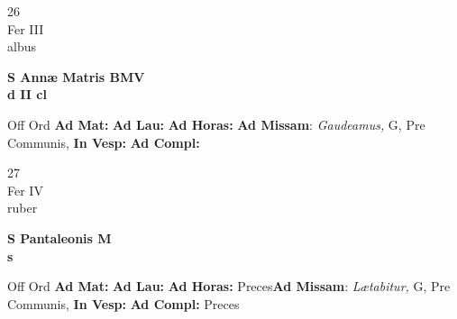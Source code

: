\documentclass[10pt, openany]{book}
\begin{document}
        \begin{center}
            \begin{minipage}{3.5in}
                \vspace{2em}
                \begin{minipage}{0.5in}
                    {\Huge 26} \\
                    {\normalsize Fer III} \\
                    {\normalsize albus}
                \end{minipage}
                \begin{minipage}{3.0in}
                    \textbf{ \large S Annæ Matris BMV \\
                    \textnormal{\normalsize d II cl}} \\ 
                \end{minipage}
                \begin{justify}Off Ord
                    \textbf{Ad Mat: }
                    \textbf{Ad Lau: }
                    \textbf{Ad Horas: }\textbf{Ad Missam}: \textit{Gaudeamus,} G, Pre Communis,  
                    \textbf{In Vesp: }
                    \textbf{Ad Compl: }
                \end{justify}
            \end{minipage}
        \end{center}
    
        \begin{center}
            \begin{minipage}{3.5in}
                \vspace{2em}
                \begin{minipage}{0.5in}
                    {\Huge 27} \\
                    {\normalsize Fer IV} \\
                    {\normalsize ruber}
                \end{minipage}
                \begin{minipage}{3.0in}
                    \textbf{ \large S Pantaleonis M \\
                    \textnormal{\normalsize s}} \\ 
                \end{minipage}
                \begin{justify}Off Ord
                    \textbf{Ad Mat: }
                    \textbf{Ad Lau: }
                    \textbf{Ad Horas: }Preces\textbf{Ad Missam}: \textit{Lætabitur,} G, Pre Communis,  
                    \textbf{In Vesp: }
                    \textbf{Ad Compl: }Preces
                \end{justify}
            \end{minipage}
        \end{center}
    
\end{document}

